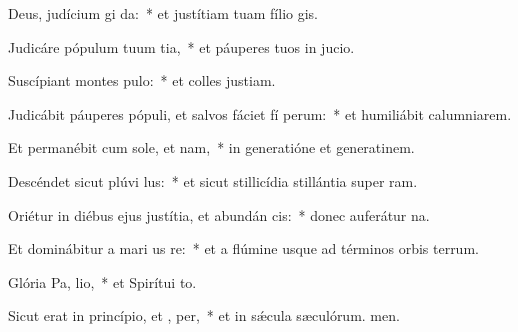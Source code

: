 \item Deus, judícium  gi da:~* et justítiam tuam fílio gis.
\item Judicáre pópulum tuum  tia,~* et páuperes tuos in jucio.
\item Suscípiant montes  pulo:~* et colles justiam.
\item Judicábit páuperes pópuli, et salvos fáciet fí perum:~* et humiliábit calumniarem.
\item Et permanébit cum sole, et  nam,~* in generatióne et generatinem.
\item Descéndet sicut plúvi  lus:~* et sicut stillicídia stillántia super ram.
\item Oriétur in diébus ejus justítia, et abundán cis:~* donec auferátur na.
\item Et dominábitur a mari us  re:~* et a flúmine usque ad términos orbis terrum.
\item Glória Pa,  lio,~* et Spirítui to.
\item Sicut erat in princípio, et ,  per,~* et in sǽcula sæculórum. men.
